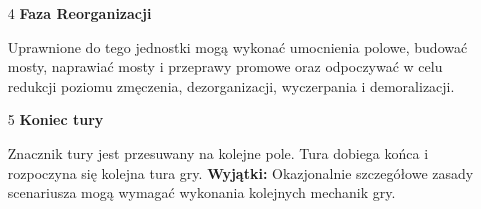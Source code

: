 \begin{itemize}
\begin{itemize}
        \end{itemize}
  \item[4] \textbf{Faza Reorganizacji}\par
        Uprawnione do tego jednostki mogą wykonać umocnienia polowe, budować mosty, naprawiać mosty i przeprawy promowe
        oraz odpoczywać w celu redukcji poziomu zmęczenia, dezorganizacji, wyczerpania i demoralizacji.
  \item[5] \textbf{Koniec tury}\par Znacznik tury jest przesuwany na kolejne pole. Tura dobiega końca i rozpoczyna się kolejna tura gry.
        \textbf{Wyjątki:} Okazjonalnie szczegółowe zasady scenariusza mogą wymagać wykonania kolejnych mechanik gry.
\end{itemize}